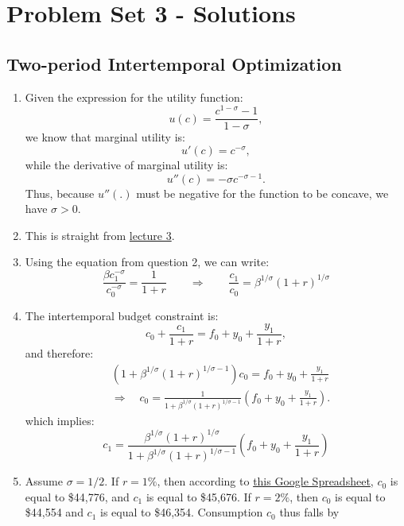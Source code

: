 \documentclass[]{book}
\theoremstyle{definition}
\theoremstyle{definition}
\theoremstyle{definition}
\theoremstyle{remark}
\begin{document}
\chapter*{Problem Set 3 - Solutions}\label{problem-set-3---solutions}

\section*{Two-period Intertemporal
Optimization}\label{two-period-intertemporal-optimization-1}

\begin{enumerate}
\def\labelenumi{\arabic{enumi}.}
\item
  Given the expression for the utility function:
  \[u(c) = \frac{c^{1-\sigma}-1}{1-\sigma},\] we know that marginal
  utility is: \[u'(c)=c^{-\sigma},\] while the derivative of marginal
  utility is: \[u''(c)=-\sigma c^{-\sigma-1}.\] Thus, because \(u''(.)\)
  must be negative for the function to be concave, we have \(\sigma>0\).
\item
  This is straight from \protect\hyperlink{two-period}{lecture 3}.
\item
  Using the equation from question 2, we can write:
  \[\frac{\beta c_1^{-\sigma}}{c_0^{-\sigma}}=\frac{1}{1+r} \qquad \Rightarrow \qquad \frac{c_1}{c_0}=\beta^{1/\sigma} (1+r)^{1/\sigma}\]
\item
  The intertemporal budget constraint is:
  \[c_0 + \frac{c_1}{1+r} = f_0 + y_0 + \frac{y_1}{1+r},\] and
  therefore: \[\begin{aligned}
  & \left(1 + \beta^{1/\sigma}(1+r)^{1/\sigma-1} \right)c_0 = f_0 + y_0 + \frac{y_1}{1+r} \\
  & \Rightarrow \quad c_0 = \frac{1}{1 + \beta^{1/\sigma}(1+r)^{1/\sigma-1}} \left( f_0 + y_0 + \frac{y_1}{1+r}\right).
  \end{aligned}\] which implies:
  \[c_1 = \frac{\beta^{1/\sigma}(1+r)^{1/\sigma}}{1 + \beta^{1/\sigma}(1+r)^{1/\sigma-1}} \left( f_0 + y_0 + \frac{y_1}{1+r}\right)\]
\item
  Assume \(\sigma = 1/2\). If \(r = 1\%\), then according to
  \href{https://docs.google.com/spreadsheets/d/1dDFa5YZE5170Tv36klHQ19ykK2bP9wjeR0Y1_h-kacg/edit?usp=sharing}{this
  Google Spreadsheet}, \(c_0\) is equal to \$44,776, and \(c_1\) is
  equal to \$45,676. If \(r = 2\%\), then \(c_0\) is equal to \$44,554
  and \(c_1\) is equal to \$46,354. Consumption \(c_0\) thus falls by

\end{enumerate}
\end{document}
